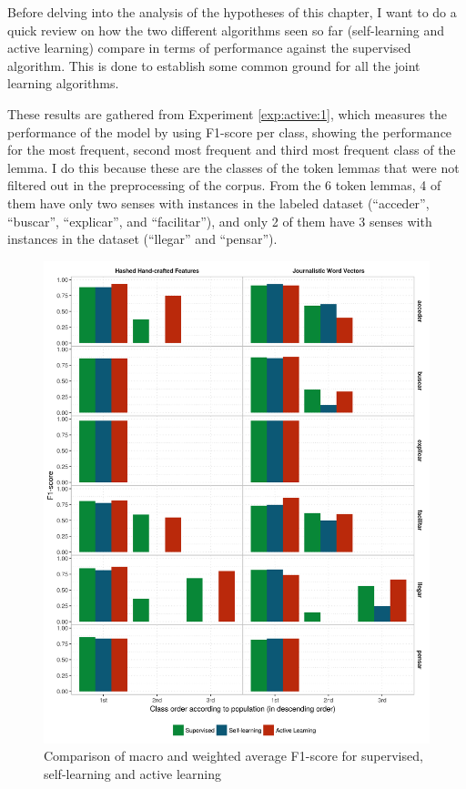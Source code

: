 Before delving into the analysis of the hypotheses of this chapter, I want to
do a quick review on how the two different algorithms seen so far
(self-learning and active learning) compare in terms of performance against the
supervised algorithm. This is done to establish some common ground for all the
joint learning algorithms.

These results are gathered from Experiment \ref{exp:active:1}, which measures
the performance of the model by using F1-score per class, showing the
performance for the most frequent, second most frequent and third most frequent
class of the lemma. I do this because these are the classes of the token lemmas
that were not filtered out in the preprocessing of the corpus. From the 6 token
lemmas, 4 of them have only two senses with instances in the labeled dataset
(``acceder'', ``buscar'', ``explicar'', and ``facilitar''), and only 2 of them
have 3 senses with instances in the dataset (``llegar'' and ``pensar'').

\begin{figure}[htb!]
  \centering
  \includegraphics[height=0.9\textheight,width=\textwidth,keepaspectratio]
    {plots/active/per_sense_fscore}
  \caption{Comparison of macro and weighted average F1-score for supervised,
  self-learning and active learning}
  \label{fig:active:performance}
\end{figure}

